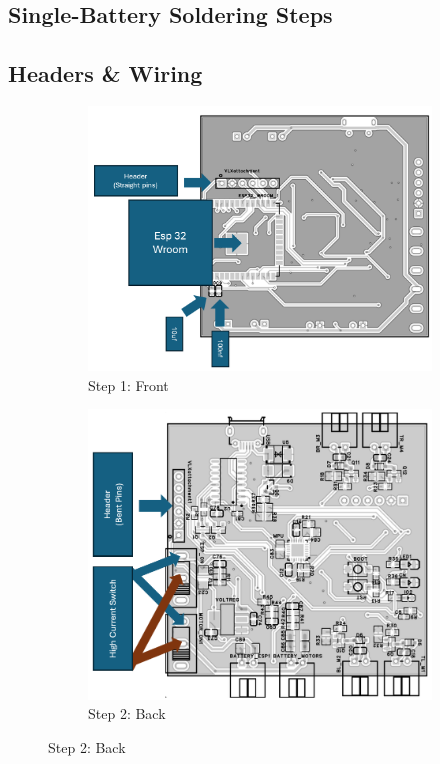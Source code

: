 \begin{manualblock}
\subsection*{Single-Battery Soldering Steps}
\subsection*{Headers \& Wiring}

\begin{figure}[H]
  \centering
  \begin{subfigure}[b]{0.48\linewidth}
    \centering
    \includegraphics[width=\linewidth]{img/assembly-1.png}
    \caption{Step 1: Front}
  \end{subfigure}
  \hfill
  \begin{subfigure}[b]{0.48\linewidth}
    \centering
    \includegraphics[width=\linewidth]{img/assembly-2.png}
    \caption{Step 2: Back}
  \end{subfigure}
\end{figure}


\end{manualblock}
